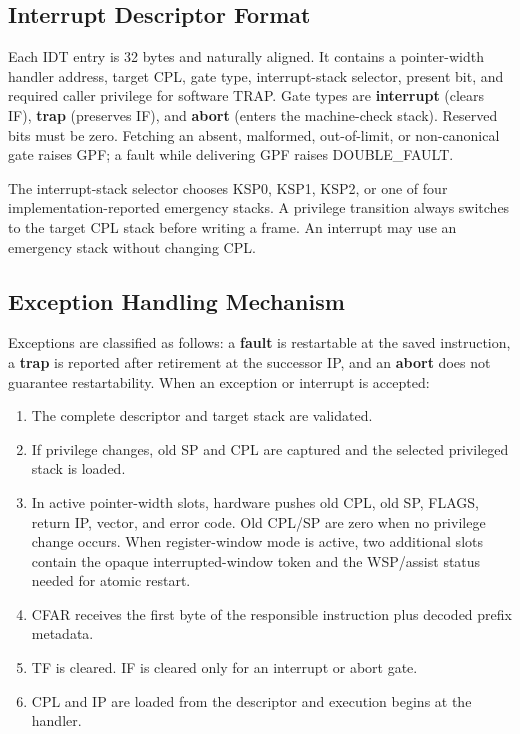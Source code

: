 \documentclass[11pt]{article}
\begin{document}
\subsection{Interrupt Descriptor Format}

Each IDT entry is 32 bytes and naturally aligned. It contains a pointer-width handler address, target CPL, gate type, interrupt-stack selector, present bit, and required caller privilege for software TRAP. Gate types are \textbf{interrupt} (clears IF), \textbf{trap} (preserves IF), and \textbf{abort} (enters the machine-check stack). Reserved bits must be zero. Fetching an absent, malformed, out-of-limit, or non-canonical gate raises GPF; a fault while delivering GPF raises DOUBLE\_FAULT.

The interrupt-stack selector chooses KSP0, KSP1, KSP2, or one of four implementation-reported emergency stacks. A privilege transition always switches to the target CPL stack before writing a frame. An interrupt may use an emergency stack without changing CPL.

\subsection{Exception Handling Mechanism}

Exceptions are classified as follows: a \textbf{fault} is restartable at the saved instruction, a \textbf{trap} is reported after retirement at the successor IP, and an \textbf{abort} does not guarantee restartability. When an exception or interrupt is accepted:

\begin{enumerate}
    \item The complete descriptor and target stack are validated.
    \item If privilege changes, old SP and CPL are captured and the selected privileged stack is loaded.
    \item In active pointer-width slots, hardware pushes old CPL, old SP, FLAGS, return IP, vector, and error code. Old CPL/SP are zero when no privilege change occurs. When register-window mode is active, two additional slots contain the opaque interrupted-window token and the WSP/assist status needed for atomic restart.
    \item CFAR receives the first byte of the responsible instruction plus decoded prefix metadata.
    \item TF is cleared. IF is cleared only for an interrupt or abort gate.
    \item CPL and IP are loaded from the descriptor and execution begins at the handler.
\end{enumerate}
\end{document}
